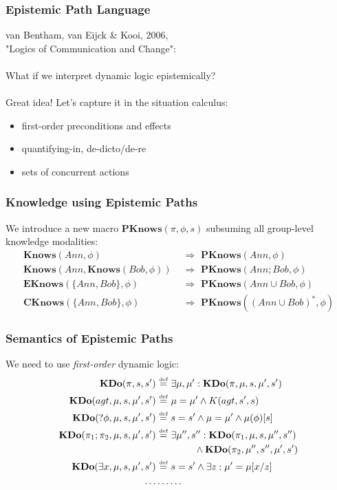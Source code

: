 \documentclass[compress]{beamer}
\newcommand{\isdef}{\hbox{$\stackrel{\mbox{\tiny def}}{=}$}}
\newcommand{\EKnows}{\mathbf{EKnows}}
\newcommand{\Knows}{\mathbf{Knows}}
\newcommand{\CKnows}{\mathbf{CKnows}}
\newcommand{\PKnows}{\mathbf{PKnows}}
\newcommand{\KDo}{\mathbf{KDo}}
\begin{document}
\begin{frame}
\frametitle{Epistemic Path Language}
van Bentham, van Eijck \& Kooi, 2006,\\
"Logics of Communication and Change":
\ \\
\ \\
What if we interpret dynamic logic epistemically?
\ \\
\ \\
\pause
Great idea!  Let's capture it in the situation calculus:
\begin{itemize}
\item first-order preconditions and effects
\item quantifying-in, de-dicto/de-re
\item sets of concurrent actions
\end{itemize}
\end{frame}

\begin{frame}
\frametitle{Knowledge using Epistemic Paths}
We introduce a new macro $\PKnows(\pi,\phi,s)$ subsuming all group-level knowledge modalities:
\begin{align*}
\Knows(Ann,\phi) &  \,\,\Rightarrow\,\,\PKnows(Ann,\phi) \\
\Knows(Ann,\Knows(Bob,\phi)) & \,\,\Rightarrow\,\,\PKnows(Ann ; Bob,\phi) \\
\EKnows(\{Ann,Bob\},\phi) & \,\,\Rightarrow\,\,\PKnows(Ann \cup Bob,\phi) \\
\CKnows(\{Ann,Bob\},\phi) & \,\,\Rightarrow\,\,\PKnows((Ann \cup Bob)^*,\phi)
\end{align*}
\end{frame}

\begin{frame}
\frametitle{Semantics of Epistemic Paths}
We need to use \emph{first-order} dynamic logic:
\begin{align*}
\KDo(\pi,s,s') & \,\,\isdef\,\,\exists \mu,\mu': \KDo(\pi,\mu,s,\mu',s') \\
\KDo(agt,\mu,s,\mu',s') & \,\,\isdef\,\,\mu = \mu' \wedge K(agt,s',s) \\
\KDo(?\phi,\mu,s,\mu',s') & \,\,\isdef\,\,s = s' \wedge \mu = \mu' \wedge \mu(\phi)[s] \\
\KDo(\pi_1 ; \pi_2,\mu,s,\mu',s') & \,\,\isdef\,\,\exists \mu'',s'': \KDo(\pi_1,\mu,s,\mu'',s'') \\
\,\,  & \,\,\,\,\,\,\,\,\,\,\,\,\,\,\,\,\,\,\,\,\,\,\,\, \wedge \KDo(\pi_2,\mu'',s'',\mu',s')\\
\KDo(\exists x,\mu,s,\mu',s') & \,\,\isdef\,\,s = s' \wedge \exists z: \mu' = \mu[x/z] \\
\dots & \dots\dots
\end{align*}
\end{frame}
\end{document}
